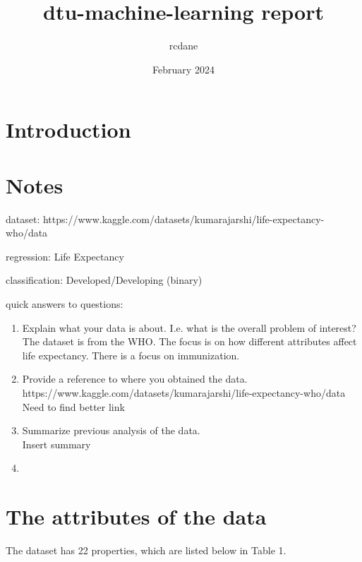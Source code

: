 \documentclass{article}
\title{dtu-machine-learning report}
\author{rcdane }
\date{February 2024}
\begin{document}
\maketitle

\section{Introduction}

\section{Notes}
dataset:
https://www.kaggle.com/datasets/kumarajarshi/life-expectancy-who/data

regression:
Life Expectancy

classification:
Developed/Developing (binary)


quick answers to questions:
\begin{enumerate}
    \item Explain what your data is about. I.e. what is the overall problem of
interest?\\
    The dataset is from the WHO. The focus is on how different attributes affect life expectancy. There is a focus on immunization.\\
    \item Provide a reference to where you obtained the data.\\ 
    https://www.kaggle.com/datasets/kumarajarshi/life-expectancy-who/data \\
    Need to find better link \\
    \item Summarize previous analysis of the data.\\
    Insert summary\\
    \item
\end{enumerate}


\newlength{\rowsep}
\setlength{\rowsep}{8pt} %

\pagebreak
\section{The attributes of the data}

The dataset has 22 properties, which are listed below in Table 1.
\end{document}

